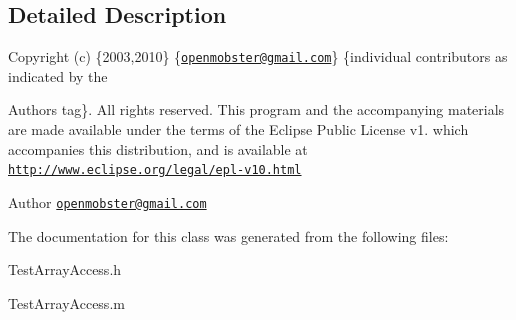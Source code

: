 \subsection{\-Detailed \-Description}
\-Copyright (c) \{2003,2010\} \{\href{mailto:openmobster@gmail.com}{\tt openmobster@gmail.\-com}\} \{individual contributors as indicated by the \begin{DoxyAuthor}{\-Authors}
tag\}. \-All rights reserved. \-This program and the accompanying materials are made available under the terms of the \-Eclipse \-Public \-License v1. which accompanies this distribution, and is available at \href{http://www.eclipse.org/legal/epl-v10.html}{\tt http\-://www.\-eclipse.\-org/legal/epl-\/v10.\-html}
\end{DoxyAuthor}
\begin{DoxyAuthor}{\-Author}
\href{mailto:openmobster@gmail.com}{\tt openmobster@gmail.\-com} 
\end{DoxyAuthor}


\-The documentation for this class was generated from the following files\-:\begin{DoxyCompactItemize}
\item 
\-Test\-Array\-Access.\-h\item 
\-Test\-Array\-Access.\-m\end{DoxyCompactItemize}
